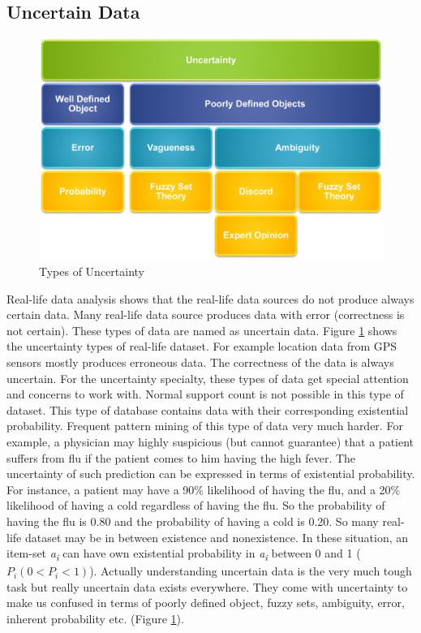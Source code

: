 \subsection{Uncertain Data}
\begin{figure}
\centering
  \includegraphics[width=.9\textwidth]{images/uncertainity_type.jpg}
\caption{Types of Uncertainty}
\label{figure:uncertainity_type}
\end{figure}
Real-life data analysis shows that the real-life data sources do not produce always certain data. Many real-life data source produces data with error (correctness is not certain). These types of data are named as uncertain data. Figure \ref{figure:uncertainity_type} shows the uncertainty types of real-life dataset. For example location data from GPS sensors mostly produces erroneous data. The correctness of the data is always uncertain. For the uncertainty specialty, these types of data get special attention and concerns to work with. Normal support count is not possible in this type of dataset. This type of database contains data with their corresponding existential probability. Frequent pattern mining of this type of data very much harder. For example, a physician may highly suspicious (but cannot guarantee) that a patient suffers from flu if the patient comes to him having the high fever. The uncertainty of such prediction can be expressed in terms of existential probability. For instance, a patient may have a 90\% likelihood of having the flu, and a 20\% likelihood of having a cold regardless of having the flu. So the probability of having the flu is 0.80 and the probability of having a cold is 0.20. So many real-life dataset may be in between existence and nonexistence. In these situation, an item-set \emph{a\textsubscript{i}} can have own existential probability in \emph{a\textsubscript{i}} between 0 and 1 ($P_i (0 < P_i < 1)$). Actually understanding uncertain data is the very much tough task but really uncertain data exists everywhere. They come with uncertainty to make us confused in terms of poorly defined object, fuzzy sets, ambiguity, error, inherent probability etc. (Figure \ref{figure:uncertainity_type}).\\
